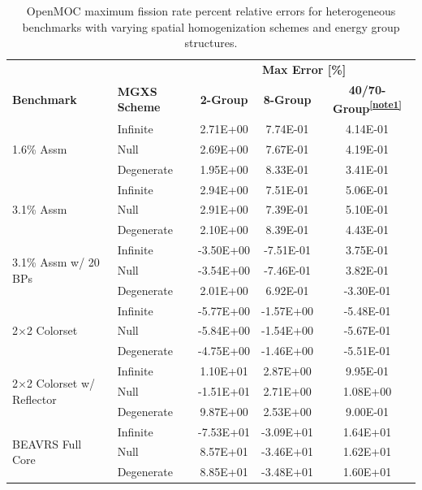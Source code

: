 \begin{table}[ht!]
  \centering
  \caption[Maximum OpenMOC fission rate errors]{OpenMOC maximum fission rate percent relative errors for heterogeneous benchmarks with varying spatial homogenization schemes and energy group structures.}
  \small
  \label{table:chap8-openmoc-max-fiss-rates}
  \vspace{6pt}
  \begin{tabular}{l l c c c}
  \toprule
  \rowcolor{lightgray}
  & & \multicolumn{3}{c}{\cellcolor{lightgray} \textbf{Max Error [\%]}} \\
  \multirow{-2}{*}{\cellcolor{lightgray} \bf Benchmark} &
  \multirow{-2}{*}{\cellcolor{lightgray} \bf \ac{MGXS} Scheme} &
  \multicolumn{1}{c}{{\cellcolor{lightgray} \bf 2-Group}} &
  \multicolumn{1}{c}{{\cellcolor{lightgray} \bf 8-Group}} &
  \multicolumn{1}{c}{{\cellcolor{lightgray} \bf 40/70-Group\textsuperscript{\ref{note1}}}} \\
  \midrule
\multirow{3}{*}{\parbox{2.5cm}{1.6\% Assm}} & Infinite & 2.71E+00 & 7.74E-01 & 4.14E-01 \\
& Null & 2.69E+00 & 7.67E-01 & 4.19E-01 \\
& Degenerate & 1.95E+00 & 8.33E-01 & 3.41E-01 \\
  \midrule
\multirow{3}{*}{\parbox{2.5cm}{3.1\% Assm}} & Infinite & 2.94E+00 & 7.51E-01 & 5.06E-01 \\
& Null & 2.91E+00 & 7.39E-01 & 5.10E-01 \\
& Degenerate & 2.10E+00 & 8.39E-01 & 4.43E-01 \\
  \midrule
\multirow{3}{*}{\parbox{2.5cm}{3.1\% Assm w/ 20 BPs}} & Infinite & -3.50E+00 & -7.51E-01 & 3.75E-01 \\
& Null & -3.54E+00 & -7.46E-01 & 3.82E-01 \\
& Degenerate & 2.01E+00 & 6.92E-01 & -3.30E-01 \\
  \midrule
\multirow{3}{*}{\parbox{2.5cm}{2$\times$2 Colorset}} & Infinite & -5.77E+00 & -1.57E+00 & -5.48E-01 \\
& Null & -5.84E+00 & -1.54E+00 & -5.67E-01 \\
& Degenerate & -4.75E+00 & -1.46E+00 & -5.51E-01 \\
  \midrule
\multirow{3}{*}{\parbox{2.5cm}{2$\times$2 Colorset w/ Reflector}} & Infinite & 1.10E+01 & 2.87E+00 & 9.95E-01 \\
& Null & -1.51E+01 & 2.71E+00 & 1.08E+00 \\
& Degenerate & 9.87E+00 & 2.53E+00 & 9.00E-01 \\
  \midrule
\multirow{3}{*}{\parbox{2.5cm}{BEAVRS Full Core}} & Infinite & -7.53E+01 & -3.09E+01 & 1.64E+01 \\
& Null & 8.57E+01 & -3.46E+01 & 1.62E+01 \\
& Degenerate & 8.85E+01 & -3.48E+01 & 1.60E+01 \\
  \bottomrule
\end{tabular}
\end{table}

